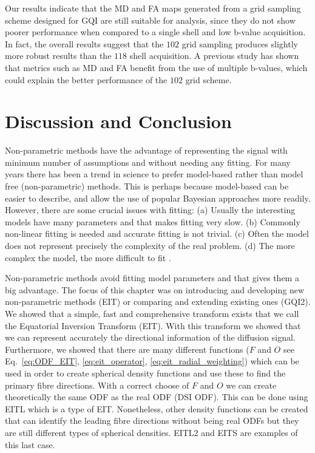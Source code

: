 \documentclass{bioinfo}
\begin{document}
Our results indicate that the MD and FA maps generated from a grid
sampling scheme designed for GQI are still suitable for analysis,
since they do not show poorer performance when compared to a single
shell and low b-value acquisition. In fact, the overall results suggest
that the $102$ grid sampling produces slightly more robust results
than the $118$ shell acquisition. A previous study \citep{correia2009looking}
has shown that metrics such as MD and FA benefit from the use of multiple
b-values, which could explain the better performance of the $102$
grid scheme.

\section{Discussion and Conclusion}

Non-parametric methods have the advantage of representing the signal
with minimum number of assumptions and without needing any fitting.  For
many years there has been a trend in science to prefer model-based
rather than model free (non-parametric) methods. This is perhaps because
model-based can be easier to describe, and allow the use of popular
Bayesian approaches more readily. However, there are some crucial issues
with fitting: (a) Usually the interesting models have many parameters
and that makes fitting very slow. (b) Commonly non-linear fitting is
needed and accurate fitting is not trivial. (c) Often the model does not
represent precisely the complexity of the real problem.  (d) The more
complex the model, the more difficult to fit
\citep{rice2006mathematical, lee1997bayesian,
montgomery2001introduction}.

Non-parametric methods avoid fitting model parameters and that gives
them a big advantage. The focus of this chapter was on introducing
and developing new non-parametric methods (EIT) or comparing and extending
existing ones (GQI2). We showed that a simple, fast and comprehensive
transform exists that we call the Equatorial Inversion Transform (EIT).
With this transform we showed that we can represent accurately the
directional information of the diffusion signal. Furthermore, we showed
that there are many different functions ($F$ and $O$ see Eq.~\ref{eq:ODF_EIT},
\ref{eq:eit_operator}, \ref{eq:eit_radial_weighting}) which can
be used in order to create spherical density functions and use these
to find the primary fibre directions. With a correct choose of $F$
and $O$ we can create theoretically the same ODF as the real ODF
(DSI ODF). This can be done using EITL which is a type of EIT. Nonetheless,
other density functions can be created that can identify the leading
fibre directions without being real ODFs but they are still different
types of spherical densities. EITL2 and EITS are examples of this
last case. 
\end{document}
